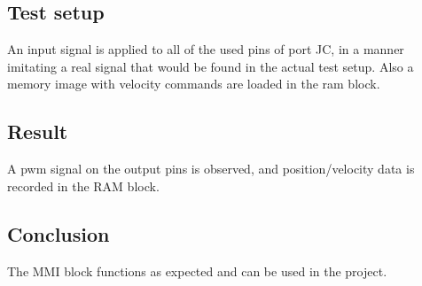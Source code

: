 \subsection{Test setup}
An input signal is applied to all of the used pins of port JC, in a manner imitating a real signal that would be found in the actual test setup. Also a memory image with velocity commands are loaded in the ram block.

\subsection{Result}
A pwm signal on the output pins is observed, and position/velocity data is recorded in the RAM block.
\subsection{Conclusion}
The MMI block functions as expected and can be used in the project.